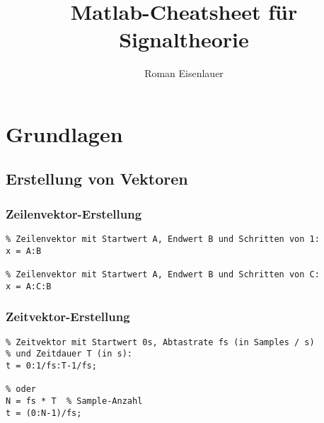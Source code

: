 \documentclass[threecolumn, 5pt, german]{latex4ei/latex4ei_sheet}
\title{Matlab-Cheatsheet für Signaltheorie}
\author{Roman Eisenlauer}
\begin{document}
	\maketitle
	
	\section{Grundlagen}
	
	\begin{sectionbox}
	
		\subsection{Erstellung von Vektoren}
		
		\subsubsection{Zeilenvektor-Erstellung}
		
		\begin{lstlisting}
% Zeilenvektor mit Startwert A, Endwert B und Schritten von 1:
x = A:B

% Zeilenvektor mit Startwert A, Endwert B und Schritten von C:
x = A:C:B
		\end{lstlisting}
		
		\subsubsection{Zeitvektor-Erstellung}
		
		\begin{lstlisting}
% Zeitvektor mit Startwert 0s, Abtastrate fs (in Samples / s)
% und Zeitdauer T (in s):
t = 0:1/fs:T-1/fs;

% oder
N = fs * T  % Sample-Anzahl
t = (0:N-1)/fs;
		\end{lstlisting}
	\end{sectionbox}
	
\end{document}
